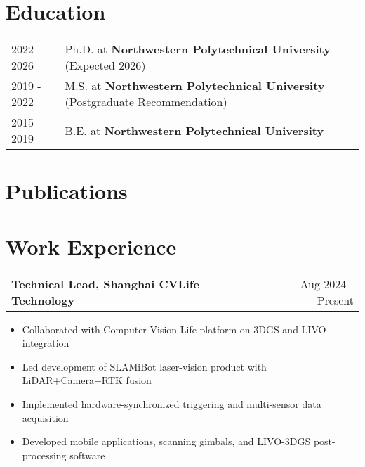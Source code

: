 \documentclass[a4paper,12pt]{article}
\makeatletter
\newenvironment{joblong}[2]
    {
    \begin{tabularx}{\linewidth}{@{}l X r@{}}
    \textbf{#1} & \hfill &  #2 \\[3.75pt]
    \end{tabularx}
    \begin{minipage}[t]{\linewidth}
    \begin{itemize}[nosep,after=\strut, leftmargin=1em, itemsep=3pt,label=--]
    }
    {
    \end{itemize}
    \end{minipage}    
    }
\makeatother
\begin{document}
\section{Education}
\begin{tabularx}{\linewidth}{@{}l X@{}}	
2022 - 2026 & Ph.D. at \textbf{Northwestern Polytechnical University} \hfill \normalsize (Expected 2026) \\

2019 - 2022 & M.S. at \textbf{Northwestern Polytechnical University} \hfill \normalsize (Postgraduate Recommendation) \\

2015 - 2019 & B.E. at \textbf{Northwestern Polytechnical University} \\
\end{tabularx}

\section{Publications}
\begin{refsection}
\nocite{coma2025,gaus2025,g2mapping2025,code2025,curriculumloc2024,rtsfm2021,densefusion2020}
\printbibliography[heading=none]
\end{refsection}

\section{Work Experience}

\begin{joblong}{Technical Lead, Shanghai CVLife Technology}{Aug 2024 - Present}
\item Collaborated with Computer Vision Life platform on 3DGS and LIVO integration
\item Led development of SLAMiBot laser-vision product with LiDAR+Camera+RTK fusion
\item Implemented hardware-synchronized triggering and multi-sensor data acquisition
\item Developed mobile applications, scanning gimbals, and LIVO-3DGS post-processing software
\end{joblong}
\end{document}
